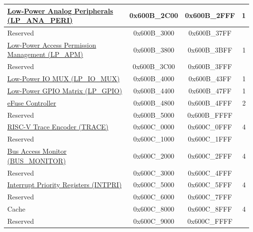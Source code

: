 \begin{ThreePartTable}
\begin{longtable}[c]{ |p{7cm}|c|c|r| }
\hyperref[mod:lowpowm]{Low-Power Analog Peripherals (LP\_ANA\_PERI)}               & 0x600B\_2C00 & 0x600B\_2FFF &   1     \\\hline
\rowcolor{gray!25}  Reserved                    & 0x600B\_3000 & 0x600B\_37FF &         \\\hline
\hyperref[mod:permctrl]{Low-Power Access Permission Management (LP\_APM)} \tnote{\textcolor{red}{2}}                     & 0x600B\_3800 & 0x600B\_3BFF &   1     \\\hline
    \rowcolor{gray!25}  Reserved                    & 0x600B\_3C00 & 0x600B\_3FFF &         \\\hline
\hyperref[mod:iomuxgpio]{Low-Power IO MUX (LP\_IO\_MUX)}                     & 0x600B\_4000 & 0x600B\_43FF &   1     \\\hline
\hyperref[mod:iomuxgpio]{Low-Power GPIO Matrix (LP\_GPIO)}                     & 0x600B\_4400 & 0x600B\_47FF &   1     \\\hline
\hyperref[mod:efuse]{eFuse Controller}                       & 0x600B\_4800 & 0x600B\_4FFF &   2     \\\hline
    \rowcolor{gray!25}  Reserved                    & 0x600B\_5000 & 0x600B\_FFFF &         \\\hline
\hyperref[mod:riscvtracenc]{RISC-V Trace Encoder (TRACE)}                       & 0x600C\_0000 & 0x600C\_0FFF &   4     \\\hline
    \rowcolor{gray!25}  Reserved                    & 0x600C\_1000 & 0x600C\_1FFF &         \\\hline
\hyperref[mod:dbgassist]{Bus Access Monitor (BUS\_MONITOR) \tnote{\textcolor{red}{2}}}               & 0x600C\_2000 & 0x600C\_2FFF &   4     \\\hline
    \rowcolor{gray!25}  Reserved                    & 0x600C\_3000 & 0x600C\_4FFF &         \\\hline
\hyperref[mod:riscvcpu]{Interrupt Priority Registers (INTPRI)}                & 0x600C\_5000 & 0x600C\_5FFF &   4     \\\hline
    \rowcolor{gray!25}  Reserved                    & 0x600C\_6000 & 0x600C\_7FFF &         \\\hline
Cache                & 0x600C\_8000 & 0x600C\_8FFF &   4     \\\hline
    \rowcolor{gray!25}  Reserved                    & 0x600C\_9000 & 0x600C\_FFFF &         \\\hline
    
\end{longtable}
\end{ThreePartTable}
